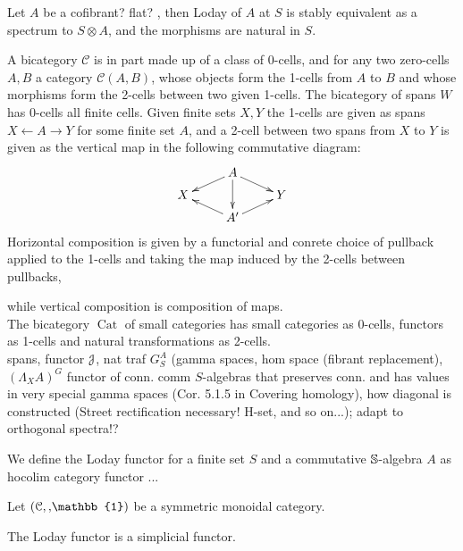     \begin{cor}\label{cor_loday_at_S_naturally_equivalent_to_tensor_with_S}
      Let $A$ be a cofibrant? flat? \hring, then Loday of $A$ at $S$ is stably equivalent as a spectrum to $S \otimes A$, and the morphisms are natural in $S$.
    \end{cor}


    A bicategory $\mathcal{C}$ is in part made up of a class of 0-cells, and for any two zero-cells $A,B$ a category $\mathcal{C}(A,B)$, whose objects form the 1-cells from $A$ to $B$ and whose morphisms form the 2-cells between two given 1-cells. The bicategory of spans $W$ has 0-cells all finite cells. Given finite sets $X,Y$ the 1-cells are given as spans $ X \leftarrow A \rightarrow Y$ for some finite set $A$, and a 2-cell between two spans from $X$ to $Y$  is given as the vertical map in the following commutative diagram:
    \[
    \xymatrix@R-=.5em{
      &
      A \ar[dl] \ar[dd] \ar[dr]
      \\
      X
      &
      &
      Y
      \\
      &
      A^\prime \ar[ul] \ar[ur]
      &
    }
    \]
    Horizontal composition is given by a functorial and conrete choice of pullback applied to the 1-cells and taking the map induced by the 2-cells between pullbacks,


    while vertical composition is composition of maps.\\
    The bicategory $\operatorname{Cat}$ of small categories has small categories as 0-cells, functors as 1-cells and natural transformations as 2-cells.
    \\
    spans, functor $\mathcal{J}$, nat traf $G^A_S$ (gamma spaces, hom space (fibrant replacement), $(\Lambda_X A)^G$ functor of conn. comm $S$-algebras that preserves conn. and has values in very special gamma spaces (Cor. 5.1.5 in Covering homology), how diagonal is constructed (Street rectification necessary! H-set, and so on...); adapt to orthogonal spectra!?
    \begin{defn}\label{def_loday_functor}
      We define the Loday functor for a finite set $S$ and a commutative $\mathbb{S}$-algebra $A$ as hocolim category functor ...

    \end{defn}

    \begin{defn}\label{def_loday_functor_in_symmetric_monoidal_category}
      Let $(\mathcal{C},\smash, \mathbb{1})$ be a symmetric monoidal category.\\
    \end{defn}

    \begin{lem}\label{lem_loday_functor_is_simplicial}
      The Loday functor is a simplicial functor.\\
    \end{lem}
